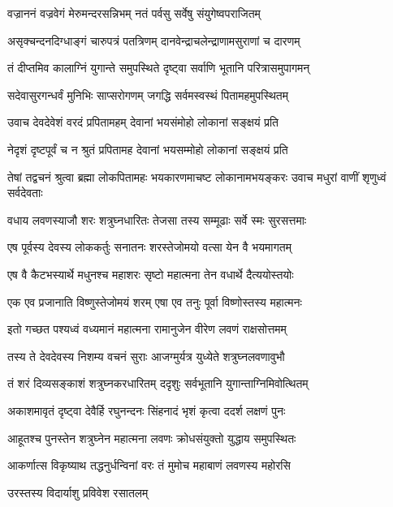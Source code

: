 \twolineshloka
{वज्राननं वज्रवेगं मेरुमन्दरसन्निभम्}
{नतं पर्वसु सर्वेषु संयुगेष्वपराजितम्} %

\twolineshloka
{असृक्चन्दनदिग्धाङ्गं चारुपत्रं पतत्रिणम्}
{दानवेन्द्राचलेन्द्राणामसुराणां च दारणम्} %

\twolineshloka
{तं दीप्तमिव कालाग्निं युगान्ते समुपस्थिते}
{दृष्ट्वा सर्वाणि भूतानि परित्रासमुपागमन्} %

\twolineshloka
{सदेवासुरगन्धर्वं मुनिभिः साप्सरोगणम्}
{जगद्धि सर्वमस्वस्थं पितामहमुपस्थितम्} %

\twolineshloka
{उवाच देवदेवेशं वरदं प्रपितामहम्}
{देवानां भयसंमोहो लोकानां सङ्क्षयं प्रति} %

\twolineshloka
{नेदृशं दृष्टपूर्वं च न श्रुतं प्रपितामह}
{देवानां भयसम्मोहो लोकानां सङ्क्षयं प्रति} %

\threelineshloka
{तेषां तद्वचनं श्रुत्वा ब्रह्मा लोकपितामहः}
{भयकारणमाचष्ट लोकानामभयङ्करः}
{उवाच मधुरां वाणीं शृणुध्वं सर्वदेवताः} %

\twolineshloka
{वधाय लवणस्याजौ शरः शत्रुघ्नधारितः}
{तेजसा तस्य सम्मूढाः सर्वे स्मः सुरसत्तमाः} %

\twolineshloka
{एष पूर्वस्य देवस्य लोककर्तुः सनातनः}
{शरस्तेजोमयो वत्सा येन वै भयमागतम्} %

\twolineshloka
{एष वै कैटभस्यार्थे मधुनश्च महाशरः}
{सृष्टो महात्मना तेन वधार्थे दैत्ययोस्तयोः} %

\twolineshloka
{एक एव प्रजानाति विष्णुस्तेजोमयं शरम्}
{एषा एव तनुः पूर्वा विष्णोस्तस्य महात्मनः} %

\twolineshloka
{इतो गच्छत पश्यध्वं वध्यमानं महात्मना}
{रामानुजेन वीरेण लवणं राक्षसोत्तमम्} %

\twolineshloka
{तस्य ते देवदेवस्य निशम्य वचनं सुराः}
{आजग्मुर्यत्र युध्येते शत्रुघ्नलवणावुभौ} %

\twolineshloka
{तं शरं दिव्यसङ्काशं शत्रुघ्नकरधारितम्}
{ददृशुः सर्वभूतानि युगान्ताग्निमिवोत्थितम्} %

\twolineshloka
{अकाशमावृतं दृष्ट्वा देवैर्हि रघुनन्दनः}
{सिंहनादं भृशं कृत्वा ददर्श लक्षणं पुनः} %

\twolineshloka
{आहूतश्च पुनस्तेन शत्रुघ्नेन महात्मना}
{लवणः क्रोधसंयुक्तो युद्धाय समुपस्थितः} %

\twolineshloka
{आकर्णात्स विकृष्याथ तद्धनुर्धन्विनां वरः}
{तं मुमोच महाबाणं लवणस्य महोरसि} %

\onelineshloka
{उरस्तस्य विदार्याशु प्रविवेश रसातलम्} %

